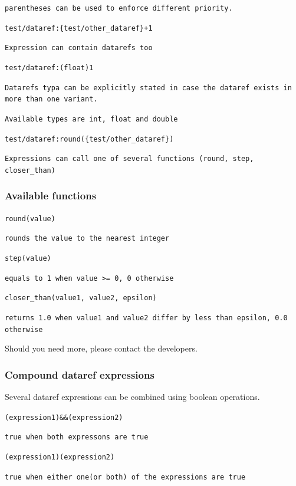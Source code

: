 \documentclass[11pt,parskip=half,a4paper]{scrartcl}
\newcommand\textstyleSourceText[1]{\texttt{#1}}
\begin{document}
{\ttfamily
\textstyleSourceText{parentheses can be used to enforce different priority.}}

\textstyleSourceText{test/dataref:\{test/other\_dataref\}+1}

{\ttfamily
\textstyleSourceText{Expression can contain datarefs too}}

\textstyleSourceText{test/dataref:(float)1}

{\ttfamily
\textstyleSourceText{Datarefs typa can be explicitly stated in case the dataref exists in more than one variant.}}

{\ttfamily
\textstyleSourceText{Available types are int, float and double}}

\textstyleSourceText{test/dataref:round(\{test/other\_dataref\})}

{\ttfamily
\textstyleSourceText{Expressions can call one of several functions (round, step, closer\_than)}}

\subsubsection{Available functions}
\textstyleSourceText{round(value)}

{\ttfamily
\textstyleSourceText{rounds the value to the nearest integer}}

\textstyleSourceText{step(value)}

{\ttfamily
\textstyleSourceText{equals to 1 when value {\textgreater}= 0, 0 otherwise}}

\textstyleSourceText{closer\_than(value1, value2, epsilon)}

{\ttfamily
\textstyleSourceText{returns 1.0 when value1 and value2 differ by less than epsilon, 0.0 otherwise}}

Should you need more, please contact the developers.

\subsubsection{Compound dataref expressions}
Several dataref expressions can be combined using boolean operations.

\textstyleSourceText{(expression1)\&\&(expression2)}

{\ttfamily
\textstyleSourceText{true when both expressons are true}}

\textstyleSourceText{(expression1){\textbar}{\textbar}(expression2)}

{\ttfamily
\textstyleSourceText{true when either one(or both) of the expressions are true}}
\end{document}
